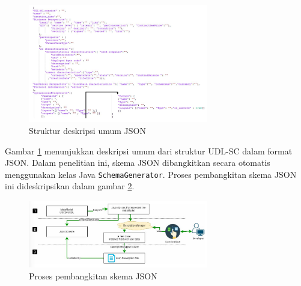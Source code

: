 \begin{figure}[ht]
  \centering
  \includegraphics[width=0.7\textwidth]{resources/chapter-2/json-structure-udl-sc.png}
  \caption{Struktur deskripsi umum JSON \parencite{udlsc}}
  \label{image:json-structure-udl-sc}
\end{figure}

Gambar \ref{image:json-structure-udl-sc} menunjukkan deskripsi umum dari struktur UDL-SC dalam format JSON. Dalam penelitian ini, skema JSON dibangkitkan secara otomatis menggunakan kelas Java \texttt{SchemaGenerator}. Proses pembangkitan skema JSON ini dideskripsikan dalam gambar \ref{image:schema-generation-udl-sc}.

\begin{figure}[ht]
  \centering
  \includegraphics[width=0.7\textwidth]{resources/chapter-2/schema-generation-udl-sc.png}
  \caption{Proses pembangkitan skema JSON \parencite{udlsc}}
  \label{image:schema-generation-udl-sc}
\end{figure}
